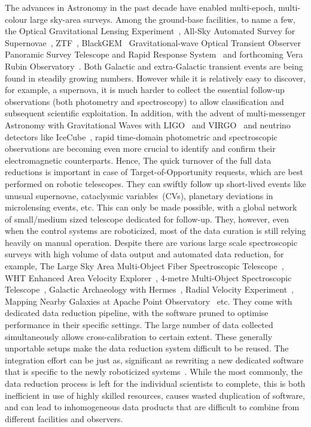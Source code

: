 \documentclass[fleqn,usenatbib]{rasti}
\begin{document}
The advances in Astronomy in the past decade have enabled multi-epoch, multi-colour
large sky-area surveys. Among the ground-base facilities, to name a few, the
Optical Gravitational Lensing Experiment~\citep[OGLE]{2015AcA....65....1U},
All-Sky Automated Survey for Supernovae~\citep[ASAS-SN]{2017PASP..129j4502K},
ZTF~\citep[Zwicky Transient Facility]{2019PASP..131a8003M},
BlackGEM~\citep[BlackGEM]{2015ASPC..496..254B}
Gravitational-wave Optical Transient Observer~\citep[GOTO]{2020SPIE11445E..7GD}
Panoramic Survey Telescope and Rapid Response System~\citep[Pan-STARRS]{2016arXiv161205560C}
and forthcoming Vera Rubin Observatory~\citep[VRO]{2019ApJ...873..111I}. Both Galactic
and extra-Galactic transient events are being found in steadily growing numbers.
However while it is relatively easy to discover, for example, a supernova, it is much
harder to collect the essential follow-up observations (both photometry and spectroscopy)
to allow classification and subsequent scientific exploitation. In addition, with the
advent of multi-messenger Astronomy with Gravitational Waves with
LIGO~\citep{2015CQGra..32g4001L} and VIRGO~\citep{2015CQGra..32b4001A} and neutrino
detectors like IceCube~\citep{2006APh....26..155I}, rapid time-domain photometric and
spectroscopic observations are becoming even more crucial to identify and confirm their
electromagnetic counterparts. Hence, The quick turnover of the full data reductions is
important in case of Target-of-Opportunity requests, which are best performed on robotic
telescopes. They can swiftly follow up short-lived events like unusual supernovae,
cataclysmic variables~(CVs), planetary deviations in microlensing events, etc. This can only be
made possible, with a global network of small/medium sized telescope dedicated for
follow-up. They, however, even when the control systems are roboticized, most of the
data curation is still relying heavily on manual operation. Despite there are various
large scale spectroscopic surveys with high volume of data output and automated data
reduction, for example, The Large Sky Area Multi-Object Fiber Spectroscopic
Telescope~\citep[LAMOST]{2012RAA....12.1197C}, WHT Enhanced Area Velocity
Explorer~\citep[WEAVE]{2012SPIE.8446E..0PD}, 4-metre Multi-Object Spectroscopic
Telescope~\citep[4MOST]{2019Msngr.175....3D}, Galactic Archaeology with
Hermes~\citep[GALAH]{2015MNRAS.449.2604D}, Radial Velocity
Experiment~\citep[RAVE]{2020AJ....160...82S}, Mapping Nearby Galaxies at Apache Point
Observatory~\citep[MaNGA]{2015ApJ...798....7B} etc. They come with dedicated data
reduction pipeline, with the software pruned to optimise performance in their specific
settings. The large number of data collected simultaneously allows cross-calibration
to certain extent. These generally unportable setups make the data reduction system
difficult to be reused. The integration effort can be just as, significant
as rewriting a new dedicated software that is specific to the newly roboticized
systems~\citep{2010SPIE.7740E..0WT}. While the most commonly, the data reduction process
is left for the individual scientists to complete, this is both inefficient in use of
highly skilled resources, causes wasted duplication of software, and can lead to
inhomogeneous data products that are difficult to combine from different facilities and
observers.
\end{document}
